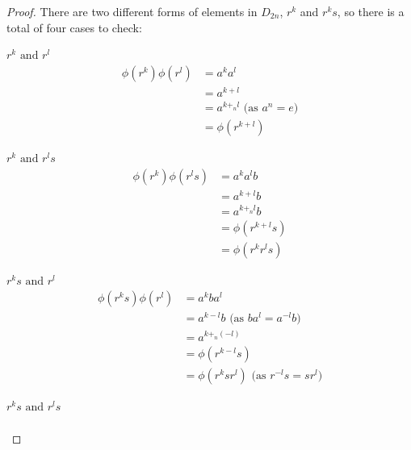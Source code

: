 \documentclass[../main.tex]{subfiles}
\begin{document}
\begin{proof}
  There are two different forms of elements in $D_{2n}$, $r^{k}$ and $r^{k}s$, so there is a total of four cases to check:
  \begin{proofcases}
    \begin{case}{$r^{k} \text{ and } r^{l}$}
      \vspace{-2em}
      \begin{align*}
        \phi(r^{k})\phi(r^{l}) &= a^{k}a^{l} \\
                               &= a^{k + l} \\
                               &= a^{k +_n l} \text{ (as $a^{n} = e$)}\\
                               &= \phi(r^{k + l})
      \end{align*}
    \end{case}
    \begin{case}{$r^{k} \text{ and } r^{l}s$}
      \vspace{-2em}
      \begin{align*}
        \phi(r^{k})\phi(r^{l}s) &= a^{k} a^{l} b \\
                                &= a^{k + l} b \\
                                &= a^{k +_n l} b \\
                                &= \phi(r^{k + l}s) \\
                                &= \phi(r^{k} r^{l} s)
      \end{align*}
    \end{case}
    \begin{case}{$r^{k}s \text{ and } r^{l}$}
      \vspace{-2em}
      \begin{align*}
        \phi(r^{k}s)\phi(r^{l}) &= a^{k} b a^{l} \\
                                &= a^{k - l} b \text{ (as $ba^{l} = a^{-l}b$)}\\
                                &= a^{k +_n (-l)} \\
                                &= \phi(r^{k - l} s) \\
                                &= \phi(r^{k}s r^{l}) \text{ (as $r^{-l}s = sr^{l}$)}
      \end{align*}
    \end{case}
    \begin{case}{$r^{k}s \text{ and } r^{l}s$}
      \vspace{-2em}
      \begin{align*}

\end{align*}
\end{case}
\end{proofcases}
\end{proof}
\end{document}
